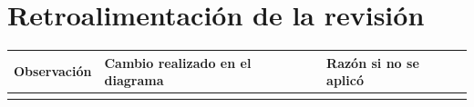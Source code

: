 \section{Retroalimentación de la revisión}
\noindent\begin{tabularx}{\linewidth}{|Y|Y|Y|}
\hline
\textbf{Observación} & \textbf{Cambio realizado en el diagrama} & \textbf{Razón si no se aplicó}\\ \hline
{} & & \\ \hline
\end{tabularx}
